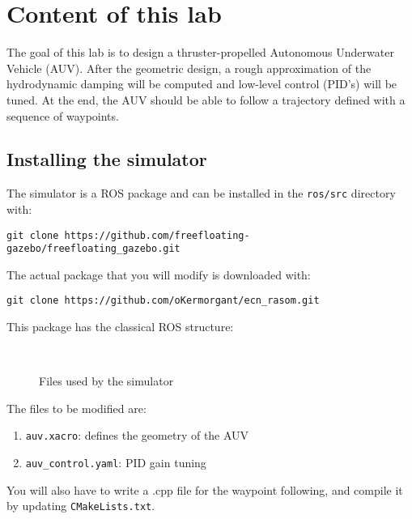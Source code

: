 \documentclass{ecnreport}
\begin{document}


\section{Content of this lab}

The goal of this lab is to design a thruster-propelled Autonomous Underwater Vehicle (AUV). After the geometric design, a rough approximation of the hydrodynamic damping will be computed
and low-level control (PID's) will be tuned. At the end, the AUV should be able to follow a trajectory defined with a sequence of waypoints.

\subsection{Installing the simulator}

The simulator is a ROS package and can be installed in the \texttt{ros/src} directory with:
\begin{center}
\begin{lstlisting}
git clone https://github.com/freefloating-gazebo/freefloating_gazebo.git
\end{lstlisting}
\end{center}

The actual package that you will modify is downloaded with:
\begin{center}
\begin{lstlisting}
git clone https://github.com/oKermorgant/ecn_rasom.git
\end{lstlisting}
\end{center}
This package has the classical ROS structure:
\begin{figure}[h]
\begin{minipage}{.25\linewidth} ~ \end{minipage}
\begin{minipage}{.5\linewidth}
\end{minipage}
\caption{Files used by the simulator}
\end{figure}

The files to be modified are:
\begin{enumerate}
 \item \texttt{auv.xacro}: defines the geometry of the AUV
 \item \texttt{auv\_control.yaml}: PID gain tuning
\end{enumerate}
You will also have to write a .cpp file for the waypoint following, and compile it by updating \texttt{CMakeLists.txt}.
\end{document}
